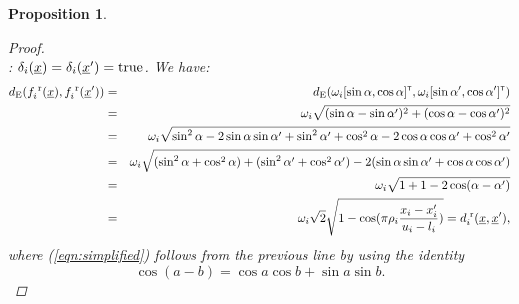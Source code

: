 \documentclass[letterpaper]{article}
\newcommand{\vect}[1]{\underline{\smash{#1}}}
\renewcommand{\v}[1]{\vect{#1}}
\newcommand{\br}{^{\text{\textnormal{ r}}}}
\newcommand\transpose{{\textrm{\tiny{\sf{T}}}}}
\newtheorem{prop}[thm]{Proposition}
\begin{document}
\begin{prop}
\begin{proof}
~\\: $\delta_i(\v{x}) = \delta_i(\v{x}') = \textrm{true}$. We have:
\begin{eqnarray}
\nonumber{}d_{\text{E}}(f_i\br(\v{x}),f_i\br(\v{x}')) & = & d_{\text{E}}(\omega_i [\sin{\alpha}, \cos{\alpha}]^\transpose, \omega_i [\sin{\alpha'}, \cos{\alpha'}]^\transpose)\\ 
\nonumber{}& = & \omega_i \sqrt{(\sin{\alpha}-\sin{\alpha'})^2+ (\cos{\alpha}-\cos{\alpha'})^2}\\
\nonumber{}& = & \omega_i \sqrt{\sin^2{\alpha} -2 \sin{\alpha}\sin{\alpha'} + \sin^2{\alpha'}  + \cos^2{\alpha} -2 \cos{\alpha}\cos{\alpha'} + \cos^2{\alpha'} }\\
\nonumber{}& = & \omega_i \sqrt{(\sin^2{\alpha}+\cos^2{\alpha})   +  (\sin^2{\alpha'}+\cos^2{\alpha'})   -2 (\sin{\alpha}\sin{\alpha'} + \cos{\alpha}\cos{\alpha'})}\\
\label{eqn:simplified}& = & \omega_i \sqrt{ 1+1-2 \cos(\alpha-\alpha')}\\
\nonumber& = & \omega_i \sqrt{2} \sqrt{1 - \cos(\pi\rho_i \frac{x_i-x_i'}{u_i-l_i})} = d\br_i(\v{x}, \v{x}'),
\end{eqnarray}
where (\ref{eqn:simplified}) follows from the previous line by using the identity 
\[\cos{(a-b)} = \cos{a}\cos{b} + \sin{a}\sin{b}.\]
\end{proof}
\end{prop}
\end{document}
